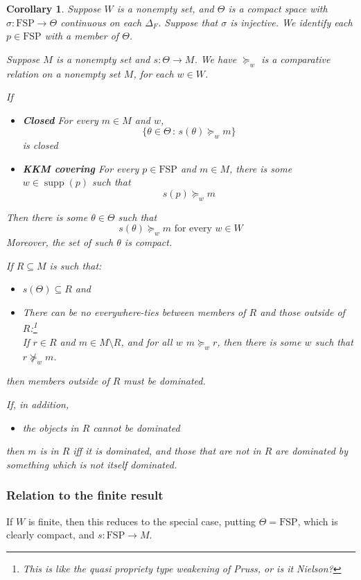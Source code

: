 \documentclass[11pt]{article}
\newtheorem{corollary}[theorem]{Corollary}
\theoremstyle{definition}
\theoremstyle{remark}
\newcommand{\supp}{\operatorname{supp}}
\newcommand{\given}{\,:\,}
\newcommand{\FSP}{\mathrm{FSP}}
\begin{document}
\begin{corollary}\label{thm:FAP}
	Suppose $W$ is a nonempty set, and $\Theta$ is a compact space with $\sigma:\FSP\to \Theta$ continuous on each $\Delta_F$. Suppose that $\sigma$ is injective. We identify each $p\in \FSP$ with a member of $\Theta$. 
	
	Suppose $M$ is a nonempty set and $s:\Theta\to M$. We have $\succeq_w$ is a comparative relation on a nonempty set $M$, for each $w\in W$. 
	
	If \begin{itemize}
		\item \textbf{Closed} For every $m\in M$ and $w$, \[\{\theta\in\Theta\given s(\theta)\succeq_w m\}\] is closed
		\item \textbf{KKM covering} For every $p\in \FSP$ and $m\in M$, there is some $w\in\supp(p)$ such that $$s(p)\succeq_w m$$
	\end{itemize}
	Then there is some $\theta\in\Theta$ such that 
	\[
	s(\theta)\succeq_w m
	\text{ for every }w\in W
	\] 
	Moreover, the set of such $\theta$ is compact.
	
	If $R\subseteq M$ is such that:
	\begin{itemize}
		\item $s(\Theta)\subseteq R$ and
		\item There can be no everywhere-ties between members of $R$ and those outside of $R$:\footnote{This is like the quasi propriety type weakening of Pruss, or is it Nielson?} \\
		If $r\in R$ and $m\in M\setminus R$, and for all $w$ $m\succeq_w r$, then there is some $w$ such that $r\not\succeq_w m$.
	\end{itemize}then members outside of $R$ must be dominated. 
	
	If, in addition, \begin{itemize}
		\item the objects in $R$ cannot be dominated
	\end{itemize} then $m$ is in $R$ iff it is dominated, and those that are not in $R$ are dominated by something which is not itself dominated. 
\end{corollary}

\subsubsection{Relation to the finite result}

If $W$ is finite, then this reduces to the special case, putting $\Theta=\FSP$, which is clearly compact, and $s:\FSP\to M$.
\end{document}
